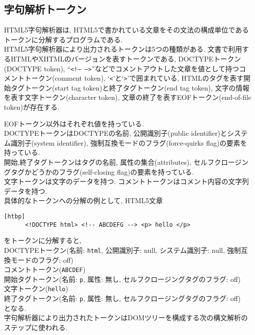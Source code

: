 \documentclass[uplatex,a4j]{jsreport}
\begin{document}
\subsection*{字句解析トークン}
HTML5字句解析器は, HTML5で書かれている文章をその文法の構成単位であるトークンに分解するプログラムである.\\
HTML5字句解析器により出力されるトークンは5つの種類がある.
文書で利用するHTMLやXHTMLのバージョンを表すトークンである, DOCTYPEトークン(DOCTYPE token), 
``\texttt{<!-- -->}''などでコメントアウトした文章を値として持つコメントトークン(comment token), 
`\texttt{<}'と`\texttt{>}'で囲まれている, HTMLのタグを表す開始タグトークン(start tag token)と終了タグトークン(end tag token), 
文字の情報を表す文字トークン(character token), 文章の終了を表すEOFトークン(end-of-file token)が存在する.

EOFトークン以外はそれぞれ値を持っている.\\
DOCTYPEトークンはDOCTYPEの名前,  公開識別子(public identifier)とシステム識別子(system identifier), 強制互換モードのフラグ(force-quirks flag)の要素を持っている.\\
開始,終了タグトークンはタグの名前, 属性の集合(attributes), セルフクロージングタグかどうかのフラグ(self-closing flag)の要素を持っている.\\
文字トークンは文字のデータを持つ. 
コメントトークンはコメント内容の文字列データを持つ.\\

具体的なトークンへの分解の例として, HTML5文章
\begin{lstlisting}[basicstyle=\ttfamily\footnotesize, frame=single][htbp]
      <!DOCTYPE html> <!-- ABCDEFG --> <p> hello </p>
\end{lstlisting}
をトークンに分解すると, \\
DOCTYPEトークン(名前: \texttt{html}, 公開識別子: null, システム識別子: null, 強制互換モードのフラグ: off)\\
コメントトークン(\texttt{ABCDEF})\\
開始タグトークン(名前: \texttt{p}, 属性: 無し, セルフクロージングタグのフラグ: off)\\
文字トークン(\texttt{hello})\\
終了タグトークン(名前: \texttt{p}, 属性: 無し, セルフクロージングタグのフラグ: off)\\
となる. \\

字句解析器により出力されたトークンはDOMツリーを構成する次の構文解析のステップに使われる.
\end{document}

